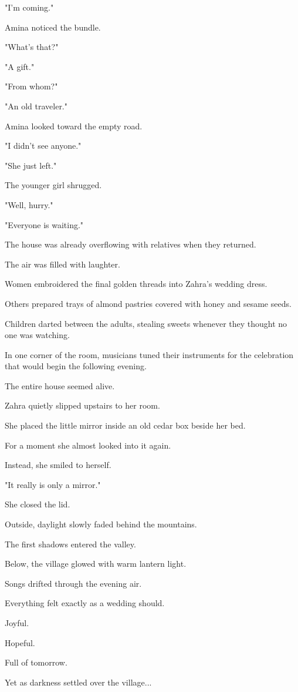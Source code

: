 \documentclass[12pt,openany]{book}
\begin{document}
"I'm coming."

Amina noticed the bundle.

"What's that?"

"A gift."

"From whom?"

"An old traveler."

Amina looked toward the empty road.

"I didn't see anyone."

"She just left."

The younger girl shrugged.

"Well, hurry."

"Everyone is waiting."

The house was already overflowing with relatives when they returned.

The air was filled with laughter.

Women embroidered the final golden threads into Zahra's wedding dress.

Others prepared trays of almond pastries covered with honey and sesame seeds.

Children darted between the adults, stealing sweets whenever they thought no one was watching.

In one corner of the room, musicians tuned their instruments for the celebration that would begin the following evening.

The entire house seemed alive.

Zahra quietly slipped upstairs to her room.

She placed the little mirror inside an old cedar box beside her bed.

For a moment she almost looked into it again.

Instead, she smiled to herself.

"It really is only a mirror."

She closed the lid.

Outside, daylight slowly faded behind the mountains.

The first shadows entered the valley.

Below, the village glowed with warm lantern light.

Songs drifted through the evening air.

Everything felt exactly as a wedding should.

Joyful.

Hopeful.

Full of tomorrow.

Yet as darkness settled over the village...
\end{document}
